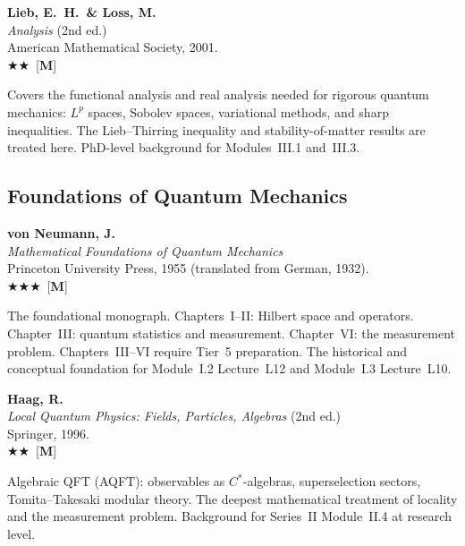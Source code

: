 \documentclass[11pt,a4paper]{article}
\newcommand{\essential}{$\bigstar\bigstar\bigstar$}
\newcommand{\recommended}{$\bigstar\bigstar$}
\newenvironment{bibentry}[1]{\begin{tcolorbox}[entrybox=#1,top=4pt,bottom=4pt]}{\end{tcolorbox}\smallskip}
\begin{document}
\begin{bibentry}{t5light}
\textbf{Lieb, E.~H.\ \& Loss, M.}\\
\textit{Analysis} (2nd ed.)\\
American Mathematical Society, 2001.\\[3pt]
\recommended\ [\textbf{M}]\\[3pt]
\begin{tcolorbox}[annotbox]
Covers the functional analysis and real analysis needed for rigorous quantum mechanics:
$L^p$ spaces, Sobolev spaces, variational methods, and sharp inequalities. The
Lieb--Thirring inequality and stability-of-matter results are treated here. PhD-level
background for Modules~III.1 and~III.3.
\end{tcolorbox}
\end{bibentry}

\subsection{Foundations of Quantum Mechanics}

\begin{bibentry}{t5light}
\textbf{von Neumann, J.}\\
\textit{Mathematical Foundations of Quantum Mechanics}\\
Princeton University Press, 1955 (translated from German, 1932).\\[3pt]
\essential\ [\textbf{M}]\\[3pt]
\begin{tcolorbox}[annotbox]
The foundational monograph. Chapters~I--II: Hilbert space and operators.
Chapter~III: quantum statistics and measurement. Chapter~VI: the measurement
problem. Chapters~III--VI require Tier~5 preparation. The historical and
conceptual foundation for Module~I.2 Lecture~L12 and Module~I.3 Lecture~L10.
\end{tcolorbox}
\end{bibentry}

\begin{bibentry}{t5light}
\textbf{Haag, R.}\\
\textit{Local Quantum Physics: Fields, Particles, Algebras} (2nd ed.)\\
Springer, 1996.\\[3pt]
\recommended\ [\textbf{M}]\\[3pt]
\begin{tcolorbox}[annotbox]
Algebraic QFT (AQFT): observables as $C^*$-algebras, superselection sectors,
Tomita--Takesaki modular theory. The deepest mathematical treatment of locality
and the measurement problem. Background for Series~II Module~II.4 at research level.
\end{tcolorbox}
\end{bibentry}
\end{document}
